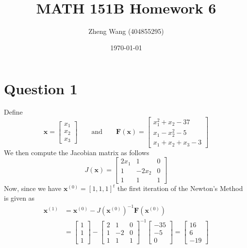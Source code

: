 \documentclass[11pt]{article}
\author{Zheng Wang (404855295)}
\date{\today}
\title{MATH 151B Homework 6}
\begin{document}

\maketitle
\section*{Question 1}
Define
\[ \mathbf{x} = \begin{bmatrix}
x_1\\x_2\\x_3
\end{bmatrix} \qquad \text{and}\qquad \mathbf{F}(\mathbf{x}) = \begin{bmatrix}
x_1^2 + x_2 -37 \\
x_1 - x_2^2-5\\
x_1 + x_2 + x_3 -3
\end{bmatrix}
\]
We then compute the Jacobian matrix as follows
\[ J(\mathbf{x}) = \begin{bmatrix}
2x_1 & 1 & 0\\
1 & -2x_2 & 0\\
1 & 1 & 1
\end{bmatrix}\]
Now, since we have $ \mathbf{x}^{(0)} = [1,1,1]^t $ the first iteration of the Newton's Method is given as
\begin{align*}
\mathbf{x}^{(1)} &= \mathbf{x}^{(0)} - J(\mathbf{x}^{(0)})^{-1} \mathbf{F}(\mathbf{x}^{(0)})\\
&= \begin{bmatrix}
1\\1\\1
\end{bmatrix} - \begin{bmatrix}
2 & 1 & 0\\ 1 & -2 & 0\\ 1 & 1 & 1
\end{bmatrix}^{-1} \begin{bmatrix}
-35\\-5\\0
\end{bmatrix}= \begin{bmatrix}
16\\6\\-19
\end{bmatrix}
\end{align*}
\end{document}
